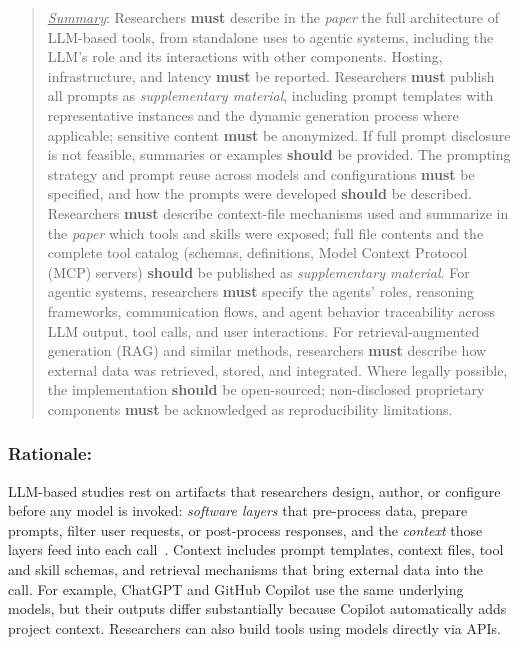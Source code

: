 \documentclass[smallextended]{svjour3}
\newcommand{\must}{\textbf{must}\xspace}
\newcommand{\should}{\textbf{should}\xspace}
\newcommand{\summary}{\underline{\emph{Summary}}\xspace}
\newcommand{\summary}{\textbf{\emph{Summary}}\xspace}
\newcommand{\paper}{\emph{paper}\xspace}
\newcommand{\supplementarymaterial}{\emph{supplementary material}\xspace}
\newcommand{\paper}{\emph{paper}\xspace}
\newcommand{\supplementarymaterial}{\emph{supplementary material}\xspace}
\newenvironment{framed}{\begin{quote}}{\end{quote}}
\newcommand{\guidelinesubsubsection}[1]{\subsubsection{\bfseries #1:}}
\newcommand{\guidelinesubsubsection}[1]{\subsubsection{#1}}
\begin{document}
\vspace{0.5\baselineskip}
\begin{framed}
\summary: Researchers \must describe in the \paper the full architecture of LLM-based tools, from standalone uses to agentic systems, including the LLM's role and its interactions with other components. Hosting, infrastructure, and latency \must be reported. Researchers \must publish all prompts as \supplementarymaterial, including prompt templates with representative instances and the dynamic generation process where applicable; sensitive content \must be anonymized. If full prompt disclosure is not feasible, summaries or examples \should be provided. The prompting strategy and prompt reuse across models and configurations \must be specified, and how the prompts were developed \should be described. Researchers \must describe context-file mechanisms used and summarize in the \paper which tools and skills were exposed; full file contents and the complete tool catalog (schemas, definitions, Model Context Protocol (MCP) servers) \should be published as \supplementarymaterial. For agentic systems, researchers \must specify the agents' roles, reasoning frameworks, communication flows, and agent behavior traceability across LLM output, tool calls, and user interactions. For retrieval-augmented generation (RAG) and similar methods, researchers \must describe how external data was retrieved, stored, and integrated. Where legally possible, the implementation \should be open-sourced; non-disclosed proprietary components \must be acknowledged as reproducibility limitations.
 \end{framed}

\guidelinesubsubsection{Rationale}

LLM-based studies rest on artifacts that researchers design, author, or configure before any model is invoked: \emph{software layers} that pre-process data, prepare prompts, filter user requests, or post-process responses, and the \emph{context} those layers feed into each call~\cite{galster2026configuring}. Context includes prompt templates, context files, tool and skill schemas, and retrieval mechanisms that bring external data into the call.
For example, ChatGPT and GitHub Copilot use the same underlying models, but their outputs differ substantially because Copilot automatically adds project context. Researchers can also build tools using models directly via APIs.
\end{document}
